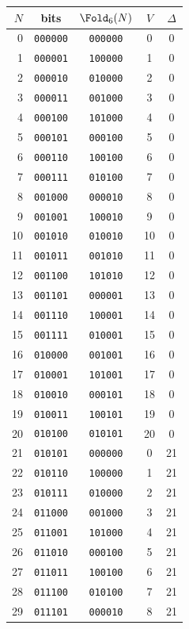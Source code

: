 \begin{tabular}{rcccc}%
\hline%
\textbf{$N$}&\textbf{bits}&\textbf{$\Fold_6(N)$}&\textbf{$V$}&\textbf{$\Delta$}\\%
\hline%
0&\texttt{000000}&\texttt{000000}&0&0\\%
1&\texttt{000001}&\texttt{100000}&1&0\\%
2&\texttt{000010}&\texttt{010000}&2&0\\%
3&\texttt{000011}&\texttt{001000}&3&0\\%
4&\texttt{000100}&\texttt{101000}&4&0\\%
5&\texttt{000101}&\texttt{000100}&5&0\\%
6&\texttt{000110}&\texttt{100100}&6&0\\%
7&\texttt{000111}&\texttt{010100}&7&0\\%
8&\texttt{001000}&\texttt{000010}&8&0\\%
9&\texttt{001001}&\texttt{100010}&9&0\\%
10&\texttt{001010}&\texttt{010010}&10&0\\%
11&\texttt{001011}&\texttt{001010}&11&0\\%
12&\texttt{001100}&\texttt{101010}&12&0\\%
13&\texttt{001101}&\texttt{000001}&13&0\\%
14&\texttt{001110}&\texttt{100001}&14&0\\%
15&\texttt{001111}&\texttt{010001}&15&0\\%
16&\texttt{010000}&\texttt{001001}&16&0\\%
17&\texttt{010001}&\texttt{101001}&17&0\\%
18&\texttt{010010}&\texttt{000101}&18&0\\%
19&\texttt{010011}&\texttt{100101}&19&0\\%
20&\texttt{010100}&\texttt{010101}&20&0\\%
21&\texttt{010101}&\texttt{000000}&0&21\\%
22&\texttt{010110}&\texttt{100000}&1&21\\%
23&\texttt{010111}&\texttt{010000}&2&21\\%
24&\texttt{011000}&\texttt{001000}&3&21\\%
25&\texttt{011001}&\texttt{101000}&4&21\\%
26&\texttt{011010}&\texttt{000100}&5&21\\%
27&\texttt{011011}&\texttt{100100}&6&21\\%
28&\texttt{011100}&\texttt{010100}&7&21\\%
29&\texttt{011101}&\texttt{000010}&8&21\\%

\end{tabular}
